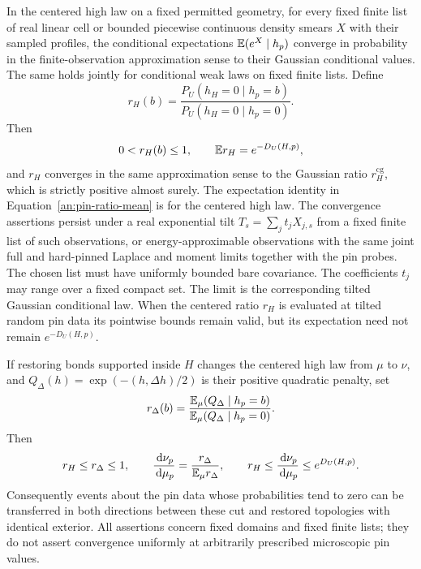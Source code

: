 \begin{proposition}
\label{an:conditional-pins}
In the centered high law on a fixed permitted geometry,
for every fixed finite list of real linear cell or bounded
piecewise continuous density smears $X$ with their sampled
profiles, the conditional expectations
$\mathbb E(e^X\mid h_p)$ converge in probability in the
finite-observation approximation sense to their
Gaussian conditional values.  The same holds jointly
for conditional weak laws on fixed finite lists.
Define
\begin{equation}
 r_H(b)=\frac{P_U(h_H=0\mid h_p=b)}
                   {P_U(h_H=0\mid h_p=0)}.
 \label{an:conditional-pin-ratio}
\end{equation}
Then
\begin{equation}
 0<r_H(b)\le1,\qquad \mathbb E r_H=e^{-D_U(H,p)},
 \label{an:pin-ratio-mean}
\end{equation}
and $r_H$ converges in the same approximation sense
to the Gaussian ratio $r_H^{\mathrm{cg}}$, which is
strictly positive almost surely.  The expectation identity in
Equation~\eqref{an:pin-ratio-mean} is for the centered high law.
The convergence assertions persist under a real exponential tilt
$T_s=\sum_jt_jX_{j,s}$ from a fixed finite list of such observations,
or energy-approximable observations with the same joint full and
hard-pinned Laplace and moment limits together with the pin probes.
The chosen list must have uniformly bounded bare covariance.
The coefficients $t_j$ may range over a
fixed compact set.  The limit is the corresponding tilted Gaussian
conditional law.  When the centered ratio $r_H$ is evaluated at
tilted random pin data its pointwise bounds remain valid, but its
expectation need not remain $e^{-D_U(H,p)}$.

If restoring bonds supported inside $H$ changes
the centered high law from $\mu$ to $\nu$, and
$Q_\Delta(h)=\exp(-(h,\Delta h)/2)$ is their
positive quadratic penalty, set
\begin{equation}
 r_\Delta(b)=
 \frac{\mathbb E_\mu(Q_\Delta\mid h_p=b)}
      {\mathbb E_\mu(Q_\Delta\mid h_p=0)}.
 \label{an:restoration-ratio}
\end{equation}
Then
\begin{equation}
 r_H\le r_\Delta\le1,\qquad
 \frac{\,\mathrm d\nu_p}{\,\mathrm d\mu_p}
      =\frac{r_\Delta}{\mathbb E_\mu r_\Delta},\qquad
 r_H\le\frac{\,\mathrm d\nu_p}{\,\mathrm d\mu_p}\le e^{D_U(H,p)}.
 \label{an:topology-density}
\end{equation}
Consequently events about the pin data whose probabilities
tend to zero can be transferred in both directions between
these cut and restored topologies with identical exterior.
All assertions concern fixed domains and fixed finite
lists; they do not assert convergence uniformly at
arbitrarily prescribed microscopic pin values.
\end{proposition}


